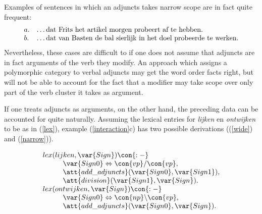 Examples of sentences in which an adjuncts takes narrow scope are in fact quite 
frequent: 
\begin{equation}
\begin{array}[t]{ll@{\hspace{0cm}}l}
a. && \ldots\mbox{dat Frits het artikel morgen probeert af te hebben.} \\
b. && \ldots\mbox{dat van Basten de bal sierlijk in het doel probeerde te 
werken.} \\
\end{array} 
\end{equation}
Nevertheless, these cases are difficult to if one does not assume that adjuncts 
are in fact arguments of the verb they modify. An approach which assigns a 
polymorphic category to verbal adjuncts may get the word order facts right, but 
will not be able to account for the fact that a modifier may take scope over 
only part of the verb cluster it takes as argument. 
 
If one treats adjuncts as arguments, on the other hand, the preceding data can
be accounted for quite naturally.  Assuming the lexical entries for {\em lijken}
en {\em ontwijken} to be as in (\ref{lex}), example (\ref{interaction}c) has two
possible derivations ((\ref{wide}) and (\ref{narrow})).

\begin{equation}
\label{lex}
\begin{array}[t]{l}
lex(lijken,\var{Sign}) \con{:-} \\
\hspace{1cm} \var{Sign0} \Leftrightarrow  \con{vp}/\con{vp}, \\
\hspace{1cm} \att{add\_adjuncts}(\var{Sign0},\var{Sign1}), \\
\hspace{1cm} \att{division}(\var{Sign1},\var{Sign}).\\
lex(ontwijken,\var{Sign}) \con{:-} \\
\hspace{1cm} \var{Sign0} \Leftrightarrow  \con{np}\backslash\con{vp}, \\
\hspace{1cm} \att{add\_adjuncts}(\var{Sign0},\var{Sign} ).
\end{array}
\end{equation}

